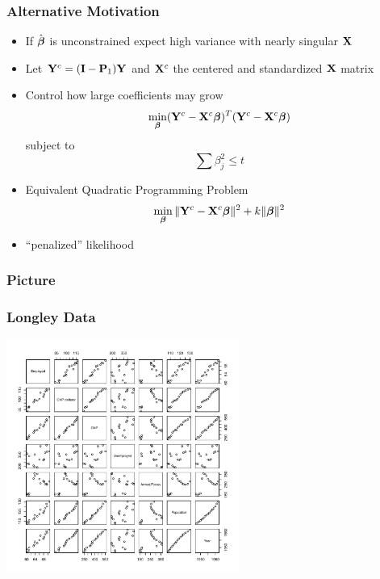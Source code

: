 \documentclass[]{beamer}\usepackage[]{graphicx}\usepackage[]{color}
\begin{document}
\begin{frame}  \frametitle{Alternative Motivation}
  \begin{itemize}
  \item If  $\hat{\boldsymbol{\beta}}$ is unconstrained  expect high variance with nearly
    singular $\mathbf{X}$ \pause
  \item Let $\mathbf{Y}^c = (\mathbf{I} - \mathbf{P}_1) \mathbf{Y}$  and $\mathbf{X}^c$ the centered and
    standardized  $\mathbf{X}$ matrix \pause
\item Control how large coefficients may grow \pause
    $$\min_{\boldsymbol{\beta}} (\mathbf{Y}^c - \mathbf{X}^c \boldsymbol{\beta})^T (\mathbf{Y}^c - \mathbf{X}^c\boldsymbol{\beta})$$
    subject to
    $$ \sum \beta_j^2 \le t$$ \pause
  \item Equivalent Quadratic Programming Problem
    $$\min_{\boldsymbol{\beta}} \| \mathbf{Y}^c - \mathbf{X}^c \boldsymbol{\beta}\|^2 + k \|\boldsymbol{\beta}\|^2$$ \pause
  \item ``penalized'' likelihood \pause
  \end{itemize}
\end{frame}
\begin{frame}\frametitle{Picture}

\end{frame}
\begin{frame}
  \frametitle{Longley Data}
  \centerline{\includegraphics[height=3in]{longley-pairs}}
\end{frame}
\end{document}
